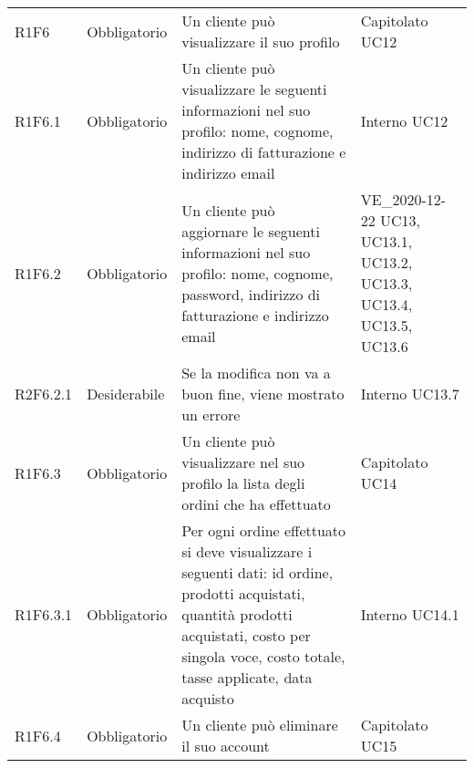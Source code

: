 {\begin{longtable}{C{2.5cm} C{2.8cm} C{6.7cm} C{2.5cm}}
R1F6 & Obbligatorio & Un cliente può visualizzare il suo profilo & Capitolato \newline UC12 \\
R1F6.1 & Obbligatorio & Un cliente può visualizzare le seguenti informazioni nel suo profilo: nome, cognome, indirizzo di fatturazione e indirizzo email & Interno \newline UC12\\
R1F6.2 & Obbligatorio & Un cliente può aggiornare le seguenti informazioni nel suo profilo: nome, cognome, password, indirizzo di fatturazione e indirizzo email & VE\_2020-12-22 \newline UC13, UC13.1, UC13.2, UC13.3, UC13.4, UC13.5, UC13.6 \\
R2F6.2.1 & Desiderabile & Se la modifica non va a buon fine, viene mostrato un errore & Interno UC13.7\\
R1F6.3 & Obbligatorio & Un cliente può visualizzare nel suo profilo la lista degli ordini che ha effettuato & Capitolato \newline UC14\\
R1F6.3.1 & Obbligatorio & Per ogni ordine effettuato si deve visualizzare i seguenti dati: id ordine, prodotti acquistati, quantità prodotti acquistati, costo per singola voce, costo totale, tasse applicate, data acquisto & Interno \newline UC14.1\\
R1F6.4 & Obbligatorio & Un cliente può eliminare il suo account & Capitolato \newline UC15\\



\end{longtable}}
